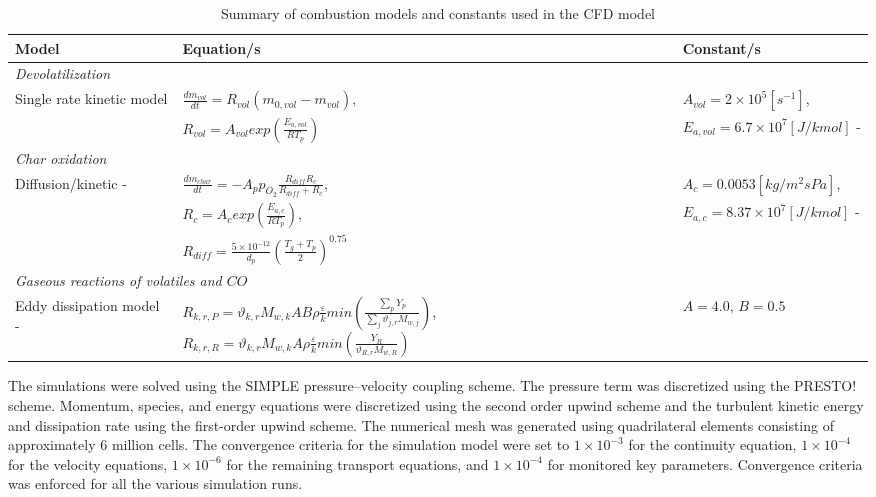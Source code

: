 \documentclass[a4paper,fleqn]{cas-sc}
\begin{document}
\begin{table}[h!]
\caption{Summary of combustion models and constants used in the CFD model}\label{tbl_combust}
\begin{tabular*}{\tblwidth}{p{}p{}p{}}
\toprule
Model & Equation/s & Constant/s\\
\midrule
\multicolumn{3}{l}{\textit{Devolatilization}} \\ %
Single rate kinetic model &$\frac{dm_{vol}}{dt} = R_{vol}(m_{0,vol}-m_{vol})$,  & $A_{vol} = 2\times10^5 [s^{-1}]$, \\
& $R_{vol} = A_{vol}exp\left(\frac{E_{a,vol}}{RT_p}\right)$ & $ E_{a,vol} = 6.7\times10^7 [J/kmol]$ - \cite{Sheng2004} \\
\multicolumn{3}{l}{\textit{Char oxidation}} \\
Diffusion/kinetic - \citep{Baum1971} & $\frac{dm_{char}}{dt} = -A_p p_{O_{2}} \frac{R_{diff}R_c}{R_{diff} + R_c}$,  & $A_{c} = 0.0053 [kg/m^2sPa]$, \\
& $R_{c} = A_{c}exp\left(\frac{E_{a,c}}{RT_p}\right)$,  & $E_{a,c} = 8.37\times10^7 [J/kmol]$ - \cite{Sheng2004} \\
& $R_{diff} = \frac{5\times10^{-12}}{d_p} \left(\frac{T_g+T_p}{2}\right)^{0.75}$&\\
\multicolumn{3}{l}{\textit{Gaseous reactions of volatiles and $CO$}} \\
Eddy dissipation model - \cite{Ansys} & $R_{k,r,P} =\vartheta_{k,r}M_{w,k}AB\rho\frac{\varepsilon}{k}min\left(\frac{\sum_{p} Y_p}{\sum_{j}\vartheta_{j,r}M_{w,j}}\right)$, $R_{k,r,R} =\vartheta_{k,r}M_{w,k}A\rho\frac{\varepsilon}{k}min\left(\frac{Y_R}{\vartheta_{R,r}M_{w,R}}\right)$ & $A=4.0$, $B=0.5$\\
\bottomrule
\end{tabular*}
\end{table}

The simulations were solved using the SIMPLE pressure–velocity coupling scheme. The pressure term was discretized using the PRESTO! scheme. Momentum, species, and energy equations were discretized using the second order upwind scheme and the turbulent kinetic energy and dissipation rate using the first-order upwind scheme. The numerical mesh was generated using quadrilateral elements consisting of approximately 6 million cells.  The convergence criteria for the simulation model were set to $1\times10^{-3}$ for the continuity equation, $1\times10^{-4}$ for the velocity equations, $1\times10^{-6}$ for the remaining transport equations, and $1\times10^{-4}$ for monitored key parameters. Convergence criteria was enforced for all the various simulation runs.
\end{document}
